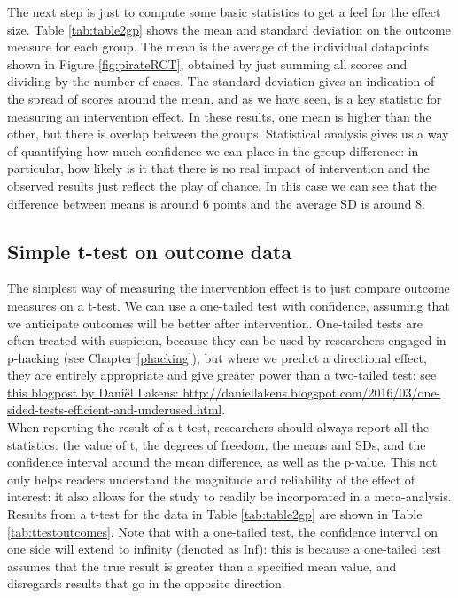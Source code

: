 \documentclass{krantz}
\begin{document}
The next step is just to compute some basic statistics to get a feel for the effect size. Table \ref{tab:table2gp} shows the mean and standard deviation on the outcome measure for each group. The mean is the average of the individual datapoints shown in Figure \ref{fig:pirateRCT}, obtained by just summing all scores and dividing by the number of cases. The standard deviation gives an indication of the spread of scores around the mean, and as we have seen, is a key statistic for measuring an intervention effect. In these results, one mean is higher than the other, but there is overlap between the groups. Statistical analysis gives us a way of quantifying how much confidence we can place in the group difference: in particular, how likely is it that there is no real impact of intervention and the observed results just reflect the play of chance. In this case we can see that the difference between means is around 6 points and the average SD is around 8.

\hypertarget{simple-t-test-on-outcome-data}{%
\subsection{Simple t-test on outcome data}\label{simple-t-test-on-outcome-data}}

The simplest way of measuring the intervention effect is to just compare outcome measures on a t-test. We can use a one-tailed test with confidence, assuming that we anticipate outcomes will be better after intervention. One-tailed tests are often treated with suspicion, because they can be used by researchers engaged in p-hacking (see Chapter \ref{phacking}), but where we predict a directional effect, they are entirely appropriate and give greater power than a two-tailed test: see \href{http://daniellakens.blogspot.com/2016/03/one-sided-tests-efficient-and-underused.html}{this blogpost by Daniël Lakens: http://daniellakens.blogspot.com/2016/03/one-sided-tests-efficient-and-underused.html}.\\
When reporting the result of a t-test, researchers should always report all the statistics: the value of t, the degrees of freedom, the means and SDs, and the confidence interval around the mean difference, as well as the p-value. This not only helps readers understand the magnitude and reliability of the effect of interest: it also allows for the study to readily be incorporated in a meta-analysis. Results from a t-test for the data in Table \ref{tab:table2gp} are shown in Table \ref{tab:ttestoutcomes}. Note that with a one-tailed test, the confidence interval on one side will extend to infinity (denoted as Inf): this is because a one-tailed test assumes that the true result is greater than a specified mean value, and disregards results that go in the opposite direction. 
\end{document}
